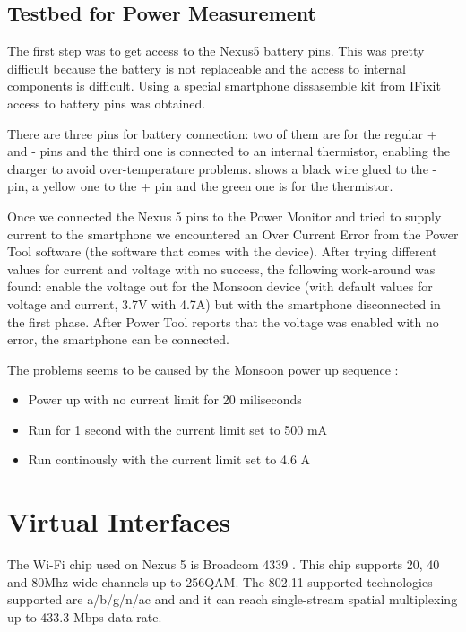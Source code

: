 \subsection{Testbed for Power Measurement}
\label{sub-sec:proj-scopepowertopology}

The first step was to get access to the Nexus5 battery pins. This was pretty difficult because the battery is not replaceable and the access to internal components is difficult. Using a special smartphone dissasemble kit from IFixit \cite{cite-ifixit} access to battery pins was obtained.

There are three pins for battery connection: two of them are for the regular + and - pins and the third one is connected to an internal thermistor, enabling the charger to avoid over-temperature problems.  shows a black wire glued to the - pin, a yellow one to the + pin and the green one is for the thermistor.

Once we connected the Nexus 5 pins to the Power Monitor and tried to supply current to the smartphone we encountered an Over Current Error from the Power Tool software (the software that comes with the device). After trying different values for current and voltage with no success, the following work-around was found: enable the voltage out for the Monsoon device (with default values for voltage and current, 3.7V with 4.7A) but with the smartphone disconnected in the first phase. After Power Tool reports that the voltage was enabled with no error, the smartphone can be connected.


The problems seems to be caused by the Monsoon power up sequence \cite{cite-manualmonsoon}:
\begin{itemize}
  \item Power up with no current limit for 20 miliseconds
  \item Run for 1 second with the current limit set to 500 mA
  \item Run continously with the current limit set to 4.6 A
\end{itemize}

\section{Virtual Interfaces}
\label{sec:virtual-interfaces}

The Wi-Fi chip used on Nexus 5 is Broadcom 4339 \cite{cite-wifichip} \cite{cite-ifixit}. This chip supports 20, 40 and 80Mhz wide channels up to 256QAM. The 802.11 supported technologies supported are a/b/g/n/ac and and it can reach single-stream spatial multiplexing up to 433.3 Mbps data rate. 

